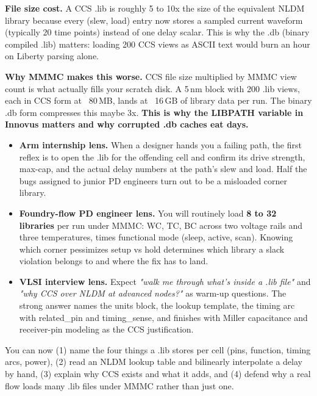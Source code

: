 \textbf{File size cost.} A CCS .lib is roughly 5 to 10x the size of the equivalent NLDM library because every (slew, load) entry now stores a sampled current waveform (typically 20 time points) instead of one delay scalar. This is why the .db (binary compiled .lib) matters: loading 200 CCS views as ASCII text would burn an hour on Liberty parsing alone.

\begin{sidebar}
\textbf{Why MMMC makes this worse.} CCS file size multiplied by MMMC view count is what actually fills your scratch disk. A 5\,nm block with 200 .lib views, each in CCS form at ~80\,MB, lands at ~16\,GB of library data per run. The binary .db form compresses this maybe 3x. \textbf{This is why the LIBPATH variable in Innovus matters and why corrupted .db caches eat days.}
\end{sidebar}

\begin{pdnote}
\begin{itemize}[leftmargin=*]
  \item \textbf{Arm internship lens.} When a designer hands you a failing path, the first reflex is to open the .lib for the offending cell and confirm its drive strength, max-cap, and the actual delay numbers at the path's slew and load. Half the bugs assigned to junior PD engineers turn out to be a misloaded corner library.
  \item \textbf{Foundry-flow PD engineer lens.} You will routinely load \textbf{8 to 32 libraries} per run under MMMC: WC, TC, BC across two voltage rails and three temperatures, times functional mode (sleep, active, scan). Knowing which corner pessimizes setup vs hold determines which library a slack violation belongs to and where the fix has to land.
  \item \textbf{VLSI interview lens.} Expect \emph{"walk me through what's inside a .lib file"} and \emph{"why CCS over NLDM at advanced nodes?"} as warm-up questions. The strong answer names the units block, the lookup template, the timing arc with related\_pin and timing\_sense, and finishes with Miller capacitance and receiver-pin modeling as the CCS justification.
\end{itemize}
\end{pdnote}

\begin{checkpoint}
You can now (1) name the four things a .lib stores per cell (pins, function, timing arcs, power), (2) read an NLDM lookup table and bilinearly interpolate a delay by hand, (3) explain why CCS exists and what it adds, and (4) defend why a real flow loads many .lib files under MMMC rather than just one.

\end{checkpoint}

